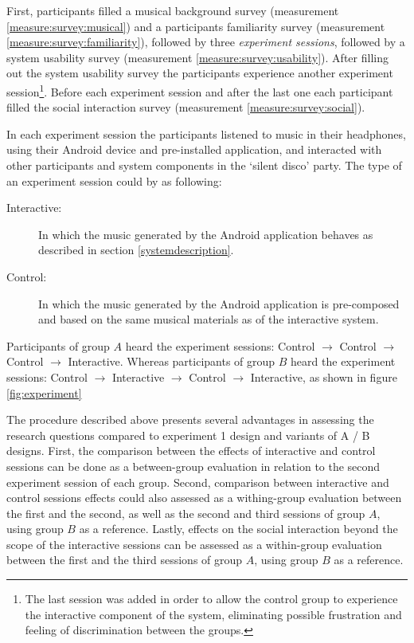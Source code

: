\documentclass[a4paper,11pt]{article}
\newcommand{\definition}[1]{\emph{#1}}
\begin{document}
{First, participants filled a musical background survey (measurement \ref{measure:survey:musical}) and a participants familiarity survey (measurement \ref{measure:survey:familiarity}), followed by three \definition{experiment sessions}, followed by a system usability survey (measurement \ref{measure:survey:usability}).
After filling out the system usability survey the participants experience another experiment session\footnote{The last session was added in order to allow the control group to experience the interactive component of the system, eliminating possible frustration and feeling of discrimination between the groups.}.
Before each experiment session and after the last one each participant filled the social interaction survey (measurement \ref{measure:survey:social}).

In each experiment session the participants listened to music in their headphones, using their Android device and pre-installed application, and interacted with other participants and system components in the `silent disco' party.
The type of an experiment session could by as following:

\begin{description}
	\item[Interactive:] In which the music generated by the Android application behaves as described in section \ref{systemdescription}.
	\item[Control:] In which the music generated by the Android application is pre-composed and based on the same musical materials as of the interactive system.
\end{description}

Participants of group $A$ heard the experiment sessions: Control $\rightarrow$ Control $\rightarrow$ Control $\rightarrow$ Interactive.
Whereas participants of group $B$ heard the experiment sessions: Control $\rightarrow$ Interactive $\rightarrow$ Control $\rightarrow$ Interactive, as shown in figure \ref{fig:experiment}

The procedure described above presents several advantages in assessing the research questions compared to experiment 1 design and variants of A / B designs.
First, the comparison between the effects of interactive and control sessions can be done as a between-group evaluation in relation to the second experiment session of each group.
Second, comparison between interactive and control sessions effects could also assessed as a withing-group evaluation between the first and the second, as well as the second and third sessions of group $A$, using group $B$ as a reference.
Lastly, effects on the social interaction beyond the scope of the interactive sessions can be assessed as a within-group evaluation between the first and the third sessions of group $A$, using group $B$ as a reference.

}
\end{document}

